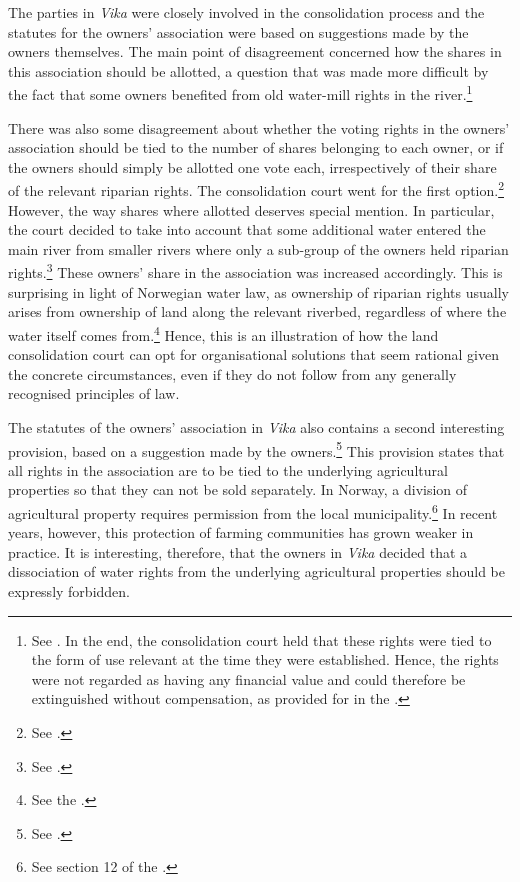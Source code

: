 The parties in \emph{Vika} were closely involved in the consolidation process and the statutes for the owners' association were based on suggestions made by the owners themselves. The main point of disagreement concerned how the shares in this association should be allotted, a question that was made more difficult by the fact that some owners benefited from old water-mill rights in the river.\footnote{See \cite[26]{stokstad11}. In the end, the consolidation court held that these rights were tied to the form of use relevant at the time they were established. Hence, the rights were not regarded as having any financial value and could therefore be extinguished without compensation, as provided for in the \dni\cite[2|36|38]{lca79}.}

There was also some disagreement about whether the voting rights in the owners' association should be tied to the number of shares belonging to each owner, or if the owners should simply be allotted one vote each, irrespectively of their share of the relevant riparian rights. The consolidation court went for the first option.\footnote{See \cite[26]{stokstad11}.} However, the way shares where allotted deserves special mention. In particular, the court decided to take into account that some additional water entered the main river from smaller rivers where only a sub-group of the owners held riparian rights.\footnote{See \cite[26]{stokstad11}.} These owners' share in the association was increased accordingly. This is surprising in light of Norwegian water law, as ownership of riparian rights usually arises from ownership of land along the relevant riverbed, regardless of where the water itself comes from.\footnote{See the \dni\cite[13]{wra00}.} Hence, this is an illustration of how the land consolidation court can opt for organisational solutions that seem rational given the concrete circumstances, even if they do not follow from any generally recognised principles of law. 

The statutes of the owners' association in {\it Vika} also contains a second interesting provision, based on a suggestion made by the owners.\footnote{See \cite[26]{stokstad11}.} This provision states that all rights in the association are to be tied to the underlying agricultural properties so that they can not be sold separately. In Norway, a division of agricultural property requires permission from the local municipality.\footnote{See section 12 of the \cite{la95}.} In recent years, however, this protection of farming communities has grown weaker in practice. It is interesting, therefore, that the owners in \emph{Vika} decided that a dissociation of water rights from the underlying agricultural properties should be expressly forbidden.

